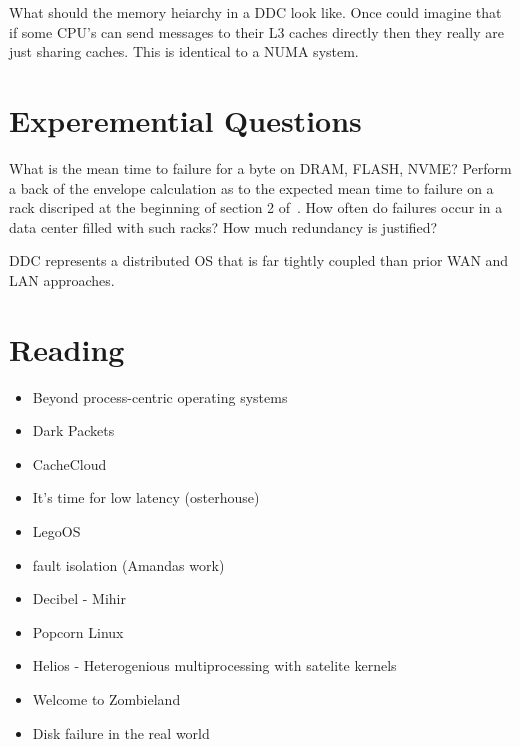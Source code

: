 What should the memory heiarchy in a DDC look like. Once could imagine that if some CPU's can send messages to their L3 caches directly then they really are just sharing caches. This is identical to a NUMA system.


\section{Experemential Questions}

What is the mean time to failure for a byte on DRAM, FLASH, NVME? Perform a
back of the envelope calculation as to the expected mean time to failure on a
rack discriped at the beginning of section 2 of~\cite{189914}. How often do
failures occur in a data center filled with such racks? How much redundancy is
justified?

DDC represents a distributed OS that is far tightly coupled than prior WAN and LAN approaches.


\section{Reading}
\begin{itemize}
    \item{Beyond process-centric operating systems}~\cite{189914}\rpaper{}
    \item{Dark Packets}\rabstract{}
    \item{CacheCloud}~\cite{cachecloud}\rintro{+}
    \item{It's time for low latency (osterhouse)}
    \item{LegoOS}\rintro{}
    \item{fault isolation (Amandas work)}\rintro{}
    \item{Decibel - Mihir}\rabstract{}
    \item{Popcorn Linux}
    \item{Helios - Heterogenious multiprocessing with satelite kernels}~\cite{helios}\rabstract{}
    \item{Welcome to Zombieland}~\cite{zombieland}\rintro{}
    \item{Disk failure in the real world}~\cite{Schroeder:2007:DFR:1267903.1267904}\rabstract{}

\end{itemize}
